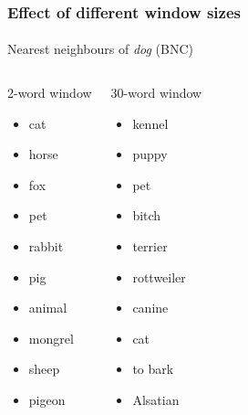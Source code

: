 \begin{frame}
  \frametitle{Effect of different window sizes}
  \framesubtitle{}

  \centering
  Nearest neighbours of \emph{dog} (BNC)
  \footnotesize
  \begin{columns}[t]
    \column{4cm}
    \begin{block}{2-word window}
      \begin{itemize}
      \item cat
      \item horse
      \item fox
      \item pet
      \item rabbit
      \item pig
      \item animal
      \item mongrel
      \item sheep
      \item pigeon
      \end{itemize}
    \end{block}
    \column{4cm}
    \begin{block}{30-word window}
      \begin{itemize}
      \item kennel
      \item puppy
      \item pet
      \item bitch
      \item terrier
      \item rottweiler
      \item canine
      \item cat
      \item to bark
      \item Alsatian
      \end{itemize}
    \end{block}
  \end{columns}
\end{frame}


